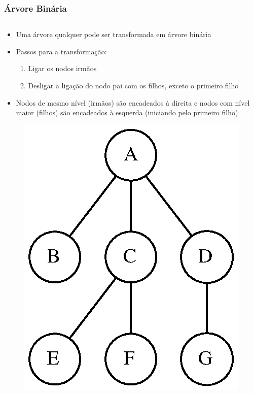 \documentclass[aspectratio=169]{beamer}
\begin{document}
\begin{frame}\frametitle{Árvore Binária}
\begin{columns}[T]
\begin{column}{0.75\linewidth}
\begin{itemize}
	\item Uma árvore qualquer pode ser transformada em árvore binária\\
	\item Passos para a transformação:\\
	\begin{enumerate}
		\item Ligar os nodos irmãos
		\item Desligar a ligação do nodo pai com os filhos, exceto o primeiro filho
	\end{enumerate}
	\item Nodos de mesmo nível (irmãos) são encadeados à direita e nodos com nível maior (filhos) são encadeados à esquerda (iniciando pelo primeiro filho)
\end{itemize}
\vspace{-4mm}
\begin{figure}[h]
	\includegraphics[height=0.3\paperheight]{imagens/arvore_b.eps} \hspace{25mm}

\end{figure}
\end{column}
\end{columns}
\end{frame}
\end{document}
